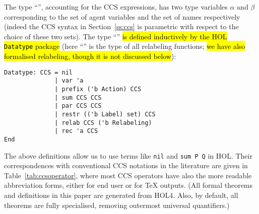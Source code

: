 The type ``'', accounting for the CCS
expressions, has two type variables $\alpha$ and $\beta$
  corresponding
%
to  %
the set of agent variables %
and %
the
set of names %
respectively (indeed the CCS syntax in Section~\ref{ss:ccs} is parametric
with respect to the choice of these two sets).
%
The type ``'' \hl{is defined
  inductively by the  HOL \texttt{Datatype} package}
(here ``'' is the type of all relabeling
  functions;   \hl{we have also formalised relabeling, though it is not
 discussed below}):
\begin{lstlisting}
Datatype: CCS = nil
              | var 'a
              | prefix ('b Action) CCS
              | sum CCS CCS
              | par CCS CCS
              | restr (('b Label) set) CCS
              | relab CCS ('b Relabeling)
              | rec 'a CCS
End
\end{lstlisting}
The above definitions allow us to use terms like \texttt{nil} and
\texttt{sum P Q} in HOL. Their correspondences with conventional CCS notations
in the literature are given in Table~\ref{tab:ccsoperator}, where
most CCS operators have also the more readable abbreviation forms,
either for end user or for \TeX{} outputs. (All
  formal theorems and definitions in this paper
  are generated from HOL4. Also, by default, all theorems are fully
  specialised, removing outermost universal quantifiers.)

